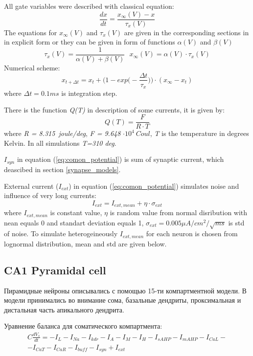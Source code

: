\documentclass[a4paper,12pt]{article}
\begin{document}
All gate variables were described with classical equation: 
\begin{equation}
\frac{dx}{dt} = \frac{x_{\infty}(V) - x}{\tau_x(V)}
\end{equation}
The equations for $x_{\infty}(V)$ and $\tau_x(V)$ are given in the corresponding sections in in explicit form or they can be given in form of functions  $\alpha(V)$ and $\beta(V)$
\begin{equation}
\tau_x(V) =  \frac{1}{\alpha(V) + \beta(V)} \ \ \ 
x_{\infty}(V) = \alpha(V) \cdot \tau_x(V)
\end{equation}
Numerical scheme:
\begin{equation}
x_{t + \Delta t} = x_t+\Big(1 - exp \Big(-\frac{\Delta t}{\tau_x} \Big) \Big)\cdot (x_{\infty}-x_t) 
\end{equation}
where $\Delta t = 0.1 ms$ is integration step.

There is the function \textit{Q(T)} in description of some currents, it is given by:
\begin{equation}
\label{eq:QT}
Q(T)= \frac{F}{ R \cdot T }
\end{equation}
where \textit{R = 8.315\ joule/deg}, \textit{F = 9.648} $\cdot 10^4 \ Coul$,
\textit{T} is the temperature in degrees Kelvin. In all simulations \textit{T=310 deg}.


$I_{syn}$ in equation (\ref{eq:comon_potential}) is sum of synaptic current, which deascibed in section \ref{synapse_models}. 

External current ($I_{ext}$) in equation (\ref{eq:comon_potential}) simulates noise and influence of very long currents:
\begin{equation}
I_{ext} = I_{ext, mean} + \eta \cdot \sigma_{ext}
\end{equation}
where $I_{ext, mean}$ is constant value,  $ \eta$ is random value from normal disribution with nean equals 0 and standart deviation equals 1, $\sigma_{ext}=0.005 \mu A/cm^2/\sqrt{ms}$ is std of noise. To simulate heterogeineously $I_{ext, mean}$ for each neuron is chosen from lognormal distribution, mean and std are given below. 

\subsection{CA1 Pyramidal cell}
Пирамидные нейроны описывались с помощью 15-ти компартментной модели. В модели принимались во внимание сома, базальные дендриты, проксимальная и дистальная часть апикального дендрита. \par
Уравнение баланса для соматического компартмента:
\begin{eqnarray}
C\frac{dV_s}{dt}=-I_L-I_{Na}-I_{kdr}-I_A-I_M-I_H-I_{sAHP}-I_{mAHP}-I_{CaL}- \nonumber \\ -I_{CaT}-I_{CaR}-I_{buff}-I_{syn} + I_{ext}
\end{eqnarray}
\end{document}
